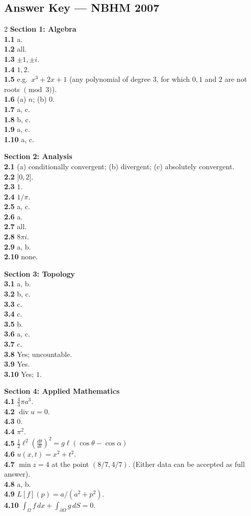 \documentclass[11pt,a4paper]{article}
\newcommand{\divg}{\operatorname{div}}
\newcommand{\examsec}[1]{%
  \subsection*{#1}
  \vspace{-2pt}
}
\begin{document}
\examsec{Answer Key --- NBHM 2007}
\begin{multicols}{2}
\textbf{Section 1: Algebra}\\
\textbf{1.1} a.\\
\textbf{1.2} all.\\
\textbf{1.3} $\pm 1, \pm i$.\\
\textbf{1.4} $1, 2$.\\
\textbf{1.5} e.g.\ $x^3 + 2x + 1$ (any polynomial of degree $3$, for which $0, 1$ and $2$ are not roots $\pmod{3}$).\\
\textbf{1.6} (a) $n$; (b) $0$.\\
\textbf{1.7} a, c.\\
\textbf{1.8} b, c.\\
\textbf{1.9} a, c.\\
\textbf{1.10} a, c.

\medskip
\textbf{Section 2: Analysis}\\
\textbf{2.1} (a) conditionally convergent; (b) divergent; (c) absolutely convergent.\\
\textbf{2.2} $]0, 2]$.\\
\textbf{2.3} $1$.\\
\textbf{2.4} $1/\pi$.\\
\textbf{2.5} a, c.\\
\textbf{2.6} a.\\
\textbf{2.7} all.\\
\textbf{2.8} $8\pi i$.\\
\textbf{2.9} a, b.\\
\textbf{2.10} none.

\medskip
\textbf{Section 3: Topology}\\
\textbf{3.1} a, b.\\
\textbf{3.2} b, c.\\
\textbf{3.3} c.\\
\textbf{3.4} c.\\
\textbf{3.5} b.\\
\textbf{3.6} a, c.\\
\textbf{3.7} c.\\
\textbf{3.8} Yes; uncountable.\\
\textbf{3.9} Yes.\\
\textbf{3.10} Yes; $1$.

\medskip
\textbf{Section 4: Applied Mathematics}\\
\textbf{4.1} $\frac{4}{3}\pi a^3$.\\
\textbf{4.2} $\divg u = 0$.\\
\textbf{4.3} $0$.\\
\textbf{4.4} $\pi^2$.\\
\textbf{4.5} $\frac{1}{2}\ell^2 \left(\frac{d\theta}{dt}\right)^2 = g\ell(\cos\theta - \cos\alpha)$\\
\textbf{4.6} $u(x, t) = x^2 + t^2$.\\
\textbf{4.7} $\min z = 4$ at the point $(8/7, 4/7)$. (Either data can be accepted as full answer).\\
\textbf{4.8} a, b.\\
\textbf{4.9} $L[f](p) = a/(a^2 + p^2)$.\\
\textbf{4.10} $\int_{\Omega} f\,dx + \int_{\partial\Omega} g\,dS = 0$.


\end{multicols}
\end{document}
